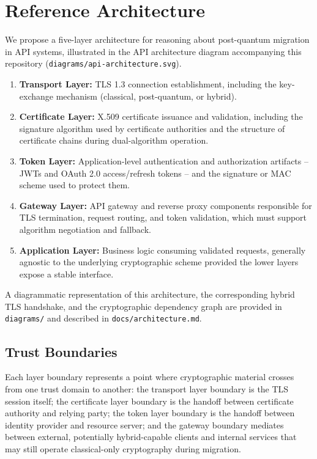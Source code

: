 \documentclass[conference]{IEEEtran}
\begin{document}
\section{Reference Architecture}
\label{sec:arch}

We propose a five-layer architecture for reasoning about post-quantum
migration in API systems, illustrated in the API architecture diagram
accompanying this repository (\texttt{diagrams/api-architecture.svg}).

\begin{enumerate}
  \item \textbf{Transport Layer:} TLS 1.3 connection establishment,
        including the key-exchange mechanism (classical, post-quantum, or
        hybrid).
  \item \textbf{Certificate Layer:} X.509 certificate issuance and
        validation, including the signature algorithm used by certificate
        authorities and the structure of certificate chains during
        dual-algorithm operation.
  \item \textbf{Token Layer:} Application-level authentication and
        authorization artifacts -- JWTs and OAuth 2.0 access/refresh tokens
        -- and the signature or MAC scheme used to protect them.
  \item \textbf{Gateway Layer:} API gateway and reverse proxy components
        responsible for TLS termination, request routing, and token
        validation, which must support algorithm negotiation and fallback.
  \item \textbf{Application Layer:} Business logic consuming validated
        requests, generally agnostic to the underlying cryptographic
        scheme provided the lower layers expose a stable interface.
\end{enumerate}

A diagrammatic representation of this architecture, the corresponding
hybrid TLS handshake, and the cryptographic dependency graph are provided
in \texttt{diagrams/} and described in \texttt{docs/architecture.md}.

\subsection{Trust Boundaries}

Each layer boundary represents a point where cryptographic material crosses
from one trust domain to another: the transport layer boundary is the TLS
session itself; the certificate layer boundary is the handoff between
certificate authority and relying party; the token layer boundary is the
handoff between identity provider and resource server; and the gateway
boundary mediates between external, potentially hybrid-capable clients and
internal services that may still operate classical-only cryptography during
migration.
\end{document}
